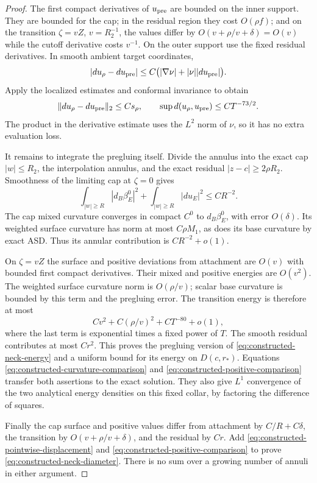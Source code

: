 \documentclass[11pt]{amsart}
\theoremstyle{definition}
\theoremstyle{remark}
\theoremstyle{plain}
\begin{document}
\begin{proof}
The first compact derivatives of $u_{\rm pre}$ are bounded on the inner
support. They are bounded for the cap; in the residual region they cost
$O(\rho f)$; and on the transition $\zeta=vZ$, $v=R_2^{-1}$, the
values differ by $O(v+\rho/v+\delta)=O(v)$ while the cutoff derivative
costs $v^{-1}$. On the outer support use the fixed residual derivatives.
In smooth ambient target coordinates,
\[
 |du_\rho-du_{\rm pre}|
       \leq C\bigl(|\nabla\nu|+|\nu||du_{\rm pre}|\bigr).
\]
Apply the localized estimates and conformal invariance to obtain
\begin{equation}\label{eq:constructed-positive-comparison}
 \|du_\rho-du_{\rm pre}\|_2\leq Cs_\rho,
       \qquad \sup d(u_\rho,u_{\rm pre})\leq CT^{-73/2}.
\end{equation}
The product in the derivative estimate uses the $L^2$ norm of $\nu$,
so it has no extra evaluation loss.

It remains to integrate the pregluing itself. Divide the annulus into
the exact cap $|w|\leq R_2$, the interpolation annulus, and the exact
residual $|z-c|\geq2\rho R_2$. Smoothness of the limiting cap at
$\zeta=0$ gives
\begin{equation}\label{eq:constructed-cap-tail}
 \int_{|w|\geq R}|d_B\beta_E^0|^2
                  +\int_{|w|\geq R}|du_E|^2\leq CR^{-2}.
\end{equation}
The cap mixed curvature converges in compact $C^0$ to $d_B\beta_E^0$,
with error $O(\delta)$. Its weighted surface curvature has norm at
most $C\rho M_1$, as does its base curvature by exact ASD. Thus its
annular contribution is $CR^{-2}+o(1)$.

On $\zeta=vZ$ the surface and positive deviations from attachment are
$O(v)$ with bounded first compact derivatives. Their mixed and positive
energies are $O(v^2)$. The weighted surface curvature norm is
$O(\rho/v)$; scalar base curvature is bounded by this term and the
pregluing error. The transition energy is therefore at most
\[
                  Cv^2+C(\rho/v)^2+CT^{-80}+o(1),
\]
where the last term is exponential times a fixed power of $T$.
The smooth residual contributes at most $Cr^2$. This proves the
pregluing version of \eqref{eq:constructed-neck-energy} and a uniform
bound for its energy on $D(c,r_*)$. Equations
\eqref{eq:constructed-curvature-comparison} and
\eqref{eq:constructed-positive-comparison} transfer both assertions to
the exact solution. They also give $L^1$ convergence of the two
analytical energy densities on this fixed collar, by factoring the
difference of squares.

Finally the cap surface and positive values differ from attachment by
$C/R+C\delta$, the transition by $O(v+\rho/v+\delta)$, and the
residual by $Cr$. Add
\eqref{eq:constructed-pointwise-displacement} and
\eqref{eq:constructed-positive-comparison} to prove
\eqref{eq:constructed-neck-diameter}. There is no sum over a growing
number of annuli in either argument.
\end{proof}
\end{document}
